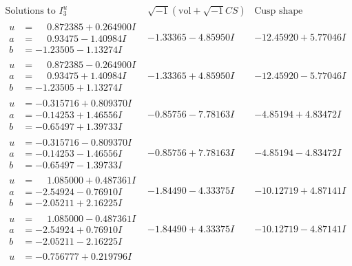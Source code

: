 \documentclass[1p]{elsarticle_modified}
\theoremstyle{definition}
\newcommand{\I}{\sqrt{-1}}
\begin{document}
$$\begin{array}{c|c|c}  
\text{Solutions to }I^u_{3}& \I (\text{vol} + \sqrt{-1}CS) & \text{Cusp shape}\\
 \hline 
\begin{aligned}
u &= \phantom{-}0.872385 + 0.264900 I \\
a &= \phantom{-}0.93475 - 1.40984 I \\
b &= -1.23505 - 1.13274 I\end{aligned}
 & -1.33365 - 4.85950 I & -12.45920 + 5.77046 I \\ \hline\begin{aligned}
u &= \phantom{-}0.872385 - 0.264900 I \\
a &= \phantom{-}0.93475 + 1.40984 I \\
b &= -1.23505 + 1.13274 I\end{aligned}
 & -1.33365 + 4.85950 I & -12.45920 - 5.77046 I \\ \hline\begin{aligned}
u &= -0.315716 + 0.809370 I \\
a &= -0.14253 + 1.46556 I \\
b &= -0.65497 + 1.39733 I\end{aligned}
 & -0.85756 - 7.78163 I & -4.85194 + 4.83472 I \\ \hline\begin{aligned}
u &= -0.315716 - 0.809370 I \\
a &= -0.14253 - 1.46556 I \\
b &= -0.65497 - 1.39733 I\end{aligned}
 & -0.85756 + 7.78163 I & -4.85194 - 4.83472 I \\ \hline\begin{aligned}
u &= \phantom{-}1.085000 + 0.487361 I \\
a &= -2.54924 - 0.76910 I \\
b &= -2.05211 + 2.16225 I\end{aligned}
 & -1.84490 - 4.33375 I & -10.12719 + 4.87141 I \\ \hline\begin{aligned}
u &= \phantom{-}1.085000 - 0.487361 I \\
a &= -2.54924 + 0.76910 I \\
b &= -2.05211 - 2.16225 I\end{aligned}
 & -1.84490 + 4.33375 I & -10.12719 - 4.87141 I \\ \hline\begin{aligned}
u &= -0.756777 + 0.219796 I \\

\end{aligned}
\end{array}$$
\end{document}
